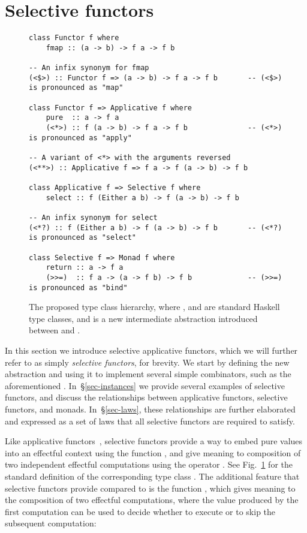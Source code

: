 \section{Selective functors}\label{sec-selective}

\begin{figure}
\begin{verbatim}
class Functor f where
    fmap :: (a -> b) -> f a -> f b

-- An infix synonym for fmap
(<$>) :: Functor f => (a -> b) -> f a -> f b       -- (<$>) is pronounced as "map"

class Functor f => Applicative f where
    pure  :: a -> f a
    (<*>) :: f (a -> b) -> f a -> f b              -- (<*>) is pronounced as "apply"

-- A variant of <*> with the arguments reversed
(<**>) :: Applicative f => f a -> f (a -> b) -> f b

class Applicative f => Selective f where
    select :: f (Either a b) -> f (a -> b) -> f b

-- An infix synonym for select
(<*?) :: f (Either a b) -> f (a -> b) -> f b       -- (<*?) is pronounced as "select"

class Selective f => Monad f where
    return :: a -> f a
    (>>=)  :: f a -> (a -> f b) -> f b             -- (>>=) is pronounced as "bind"
\end{verbatim}
\caption{The proposed type class hierarchy, where , 
and  are standard Haskell type classes, and  is
a new intermediate abstraction introduced between  and
.}\label{fig-types}
\end{figure}

In this section we introduce selective applicative functors, which we will
further refer to as simply \emph{selective functors}, for brevity. We start by
defining the new abstraction and using it to implement several simple
combinators, such as the aforementioned . In~\S\ref{sec-instances} we
provide several examples of selective functors, and discuss the relationships
between applicative functors, selective functors, and monads.
In~\S\ref{sec-laws}, these relationships are further elaborated and expressed
as a set of laws that all selective functors are required to satisfy.

Like applicative functors~\citep{mcbride2008applicative}, selective functors
provide a way to embed pure values into an effectful context  using the
function , and give meaning to composition of two independent effectful
computations using the operator \hs{<*>}. See Fig.~\ref{fig-types} for the
standard definition of the corresponding type class . The
additional feature that selective functors provide compared to 
is the function , which gives meaning to the composition of two
effectful computations, where the value produced by the first computation can be
used to decide whether to execute or to skip the subsequent computation:

